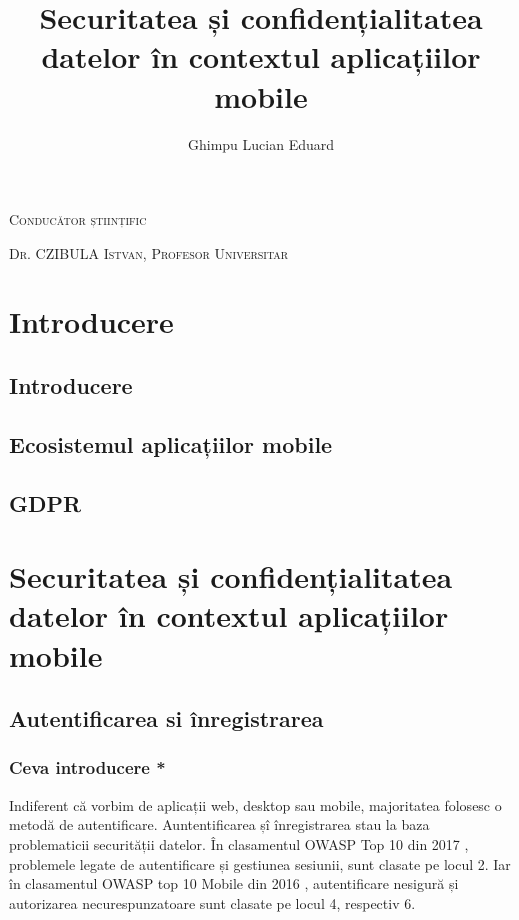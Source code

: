 \documentclass[12pt]{article}
\begin{document}
\title{Securitatea și confidențialitatea datelor în contextul aplicațiilor mobile}

\author{Ghimpu Lucian Eduard}
\maketitle

\textsc{Conducător științific}

\textsc{Dr. CZIBULA Istvan, Profesor Universitar}

\newpage

\tableofcontents

\section{Introducere}
\subsection{Introducere}
\subsection{Ecosistemul aplicațiilor mobile}
\subsection{GDPR}

\section{Securitatea și confidențialitatea datelor în contextul aplicațiilor mobile}

\subsection{Autentificarea si înregistrarea}
\newpage
\subsubsection{Ceva introducere *}

Indiferent că vorbim de aplicații web, desktop sau mobile, majoritatea folosesc 
o metodă de autentificare. Auntentificarea șî înregistrarea stau la baza
problematicii securității datelor. În clasamentul OWASP Top 10 din 2017 \cite{owasp-top10-2017}, 
problemele legate de autentificare și gestiunea sesiunii, sunt clasate pe locul 2. Iar în
clasamentul OWASP top 10 Mobile din 2016 \cite{owasp-top10-mobile}, autentificare nesigură
și autorizarea necurespunzatoare sunt clasate pe locul 4, respectiv 6.
\end{document}
